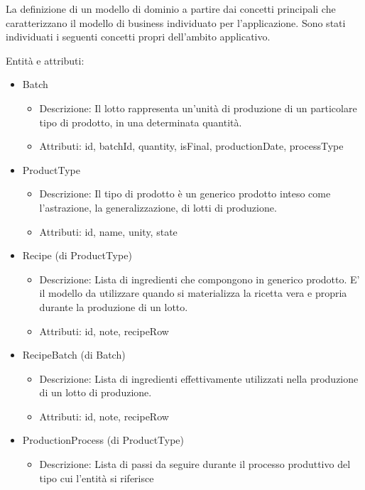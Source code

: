 \documentclass[a4paper,11pt]{article}
\begin{document}
La definizione di un modello di dominio a partire dai concetti principali che caratterizzano il modello di business individuato per l'applicazione.
Sono stati individuati i seguenti concetti propri dell'ambito applicativo.

Entità e attributi:

\begin{itemize}
  \item Batch
        \begin{itemize}
          \item Descrizione: Il lotto rappresenta un'unità di produzione di un particolare tipo di prodotto, in una determinata quantità.
          \item Attributi: id, batchId, quantity, isFinal, productionDate, processType
        \end{itemize}
  \item ProductType
        \begin{itemize}
          \item Descrizione: Il tipo di prodotto è un generico prodotto inteso come l'astrazione, la generalizzazione, di lotti di produzione.
          \item Attributi: id, name, unity, state
        \end{itemize}
  \item Recipe (di ProductType)
        \begin{itemize}
          \item Descrizione: Lista di ingredienti che compongono in generico prodotto. E' il modello da utilizzare quando si materializza la ricetta vera e propria durante la produzione di un lotto.
          \item Attributi: id, note, recipeRow
        \end{itemize}
  \item RecipeBatch (di Batch)
        \begin{itemize}
          \item Descrizione: Lista di ingredienti effettivamente utilizzati nella produzione di un lotto di produzione.
          \item Attributi: id, note, recipeRow
        \end{itemize}
  \item ProductionProcess (di ProductType)
        \begin{itemize}
          \item Descrizione: Lista di passi da seguire durante il processo produttivo del tipo cui l'entità si riferisce

\end{itemize}
\end{itemize}
\end{document}
